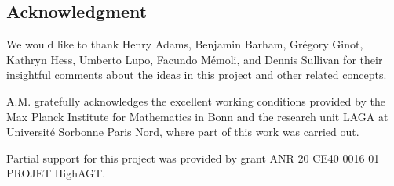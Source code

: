 
\subsection*{Acknowledgment}

We would like to thank Henry Adams, Benjamin Barham, Gr\'egory Ginot, Kathryn Hess, Umberto Lupo, Facundo M\'emoli, and Dennis Sullivan for their insightful comments about the ideas in this project and other related concepts.

A.M. gratefully acknowledges the excellent working conditions provided by the Max Planck Institute for Mathematics in Bonn and the research unit LAGA at Université Sorbonne Paris Nord, where part of this work was carried out.

Partial support for this project was provided by grant ANR 20 CE40 0016 01 PROJET HighAGT.

